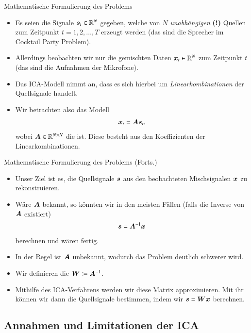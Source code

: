 \begin{frame}{Mathematische Formulierung des Problems}{}
	\begin{itemize}
		\item Es seien die Signale $\bm{s}_t \in \mathbb{R}^N$ gegeben, welche von $N$ \textit{unabhängigen} \textbf{(!)}
			Quellen zum Zeitpunkt $t = 1, 2, \ldots, T$ erzeugt werden (das sind die Sprecher im Cocktail Party Problem).
		\item Allerdings beobachten wir nur die gemischten Daten $\bm{x}_t \in \mathbb{R}^N$ zum Zeitpunkt $t$
			(das sind die Aufnahmen der Mikrofone).
		\item Das ICA-Modell nimmt an, dass es sich hierbei um \textit{Linearkombinationen} der Quellsignale handelt.
		\item Wir betrachten also das Modell
		\begin{equation}
			\bm{x}_t = \bm{A} \bm{s}_t,
		\end{equation}
		wobei $\bm{A} \in \mathbb{R}^{N \times N}$ die  ist. Diese besteht aus den Koeffizienten der
		Linearkombinationen.
	\end{itemize}
\end{frame}


\begin{frame}{Mathematische Formulierung des Problems (Forts.)}{}
	\begin{itemize}
		\item Unser Ziel ist es, die Quellsignale $\bm{s}$ aus den beobachteten Mischsignalen $\bm{x}$ zu rekonstruieren.
		\item Wäre $\bm{A}$ bekannt, so könnten wir in den meisten Fällen (falls die Inverse von $\bm{A}$ existiert)
			$$\bm{s} = \bm{A}^{-1} \bm{x}$$ berechnen und wären fertig.
		\item In der Regel ist $\bm{A}$ unbekannt, wodurch das Problem deutlich schwerer wird.
		\item Wir definieren die  $\bm{W} \coloneqq \bm{A}^{-1}$.
		\item Mithilfe des ICA-Verfahrens werden wir diese Matrix approximieren.
			Mit ihr können wir dann die Quellsignale bestimmen, indem wir $\bm{s} = \bm{W} \bm{x}$ berechnen.
	\end{itemize}
\end{frame}


\subsection{Annahmen und Limitationen der ICA}

